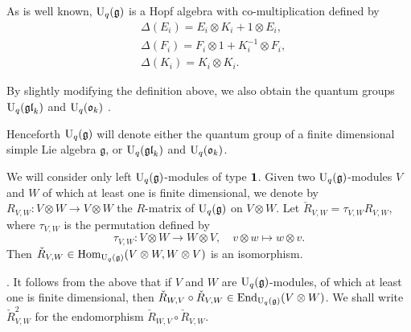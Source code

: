 \documentclass[12pt]{amsart}
\theoremstyle{definition}
\theoremstyle{remark}
\numberwithin{equation}{section}
\newcommand{\mf}{\mathfrak}
\newcommand{\fg}{{\mf g}}
\newcommand{\U}{{\rm{U}}}
\newcommand{\End}{{\rm{End}}}
\newcommand{\Hom}{{\rm{Hom}}}
\newcommand{\gl}{{\mathfrak {gl}}}
\newcommand{\ot}{\otimes}
\begin{document}
As is well known,  $\U_q(\fg)$ is a Hopf algebra with co-multiplication defined by
\[
\begin{aligned}
&\Delta(E_i)=E_i\otimes K_i + 1\otimes E_i, \\
&\Delta(F_i)=F_i\otimes 1 + K_i^{-1}\otimes F_i,\\
&\Delta(K_i)=K_i\otimes K_i. 
\end{aligned}
\]

By slightly modifying the definition above, we also obtain the quantum groups 
$\U_q (\gl_k)$  \cite{J}\cite[\S 6.1]{LZ06} and  $\U_q (\mathfrak{o}_k)$ \cite[\S8.1.2]{LZ06}. 


Henceforth $\U_q (\fg)$ will denote either the quantum group of a finite dimensional simple Lie algebra $\fg$, or 
$\U_q (\gl_k)$ and  $\U_q (\mathfrak{o}_k)$. 


We will consider only left $\U_q(\fg)$-modules of type ${\bf 1}$. 
Given two $\U_q(\fg)$-modules $V$ and $W$ of which at least one is finite dimensional, 
we denote by 
$
{R_{V, W}} : V\otimes W\longrightarrow V\otimes W
$
the $R$-matrix of $\U_q(\fg)$ on $V\otimes W$. 
Let $\check{R}_{V, W}=\tau_{V, W} R_{V, W}$, where $\tau_{V, W}$ is the permutation defined by 
\[
\tau_{V, W}: V\otimes W  \longrightarrow  W \otimes V, \quad v\otimes w \mapsto w\otimes v.
\]
Then $\check{R}_{V, W}\in\Hom_{\U_q(\fg)}(V\otimes W, W\otimes V)$ is an isomorphism.

.  It follows from the above that if $V$ and $W$ are $\U_q(\fg)$-modules, of which at
least one is finite dimensional, then $\check R_{W,V}\circ \check R_{V,W}\in\End_{\U_q(\fg)}(V\ot W)$.
We shall write $\check R_{V,W}^2$ for the endomorphism $\check R_{W,V}\circ \check R_{V,W}$.
\end{document}
